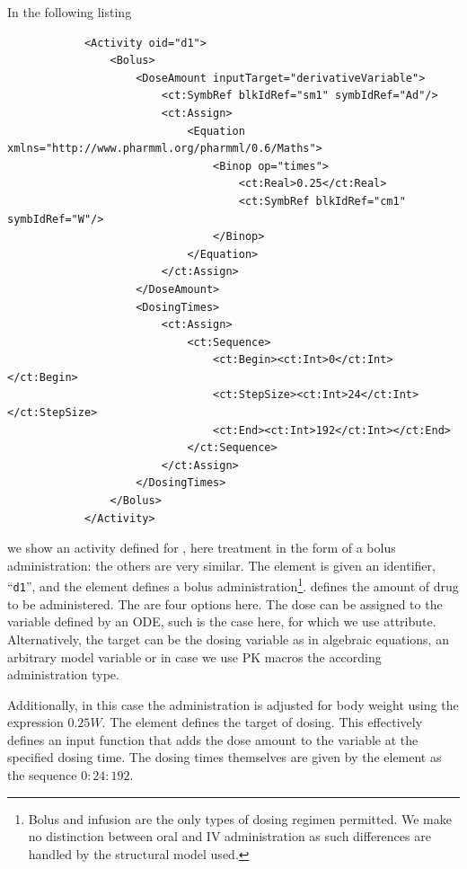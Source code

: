 In the following listing 
\lstset{language=XML}
\begin{lstlisting}
            <Activity oid="d1">
                <Bolus>
                    <DoseAmount inputTarget="derivativeVariable">
                        <ct:SymbRef blkIdRef="sm1" symbIdRef="Ad"/>
                        <ct:Assign>
                            <Equation xmlns="http://www.pharmml.org/pharmml/0.6/Maths">
                                <Binop op="times">
                                    <ct:Real>0.25</ct:Real>
                                    <ct:SymbRef blkIdRef="cm1" symbIdRef="W"/>
                                </Binop>
                            </Equation>
                        </ct:Assign>
                    </DoseAmount>
                    <DosingTimes>
                        <ct:Assign>
                            <ct:Sequence>
                                <ct:Begin><ct:Int>0</ct:Int></ct:Begin>
                                <ct:StepSize><ct:Int>24</ct:Int></ct:StepSize>
                                <ct:End><ct:Int>192</ct:Int></ct:End>
                            </ct:Sequence>
                        </ct:Assign>
                    </DosingTimes>
                </Bolus>
            </Activity>
\end{lstlisting}
we show an activity defined for ,
here treatment in the form of a bolus administration: the others are very similar.
The  element is given an identifier, ``\texttt{d1}'',
and the element  defines a
bolus administration\footnote{Bolus and infusion are the only types of
dosing regimen permitted. We make no distinction between oral and IV
administration as such differences are handled by the structural
model used.}.   defines the amount of drug to be
administered. The are four options here. The dose can be assigned
to the variable defined by an ODE, such is the case here, for which we use
 attribute. Alternatively, the target can 
be the dosing variable  as in algebraic equations, an arbitrary model variable 
or in case we use PK macros the according administration type.

Additionally, in this case the administration is adjusted for body
weight using the expression $0.25W$. The element 
defines the target of dosing. This effectively defines an input
function that adds the dose amount
to the variable  at the specified dosing time. The dosing
times themselves are given by the  element as the
sequence $0:24:192$.

